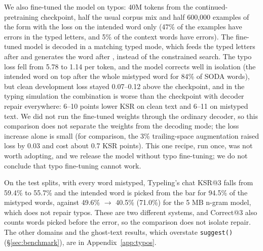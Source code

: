\documentclass[11pt]{article}
\newcommand{\tok}[1]{\texttt{\detokenize{#1}}}
\begin{document}
We also fine-tuned the model on typos: 40M tokens from the continued-pretraining checkpoint, half the usual corpus
mix and half 600,000 examples of the form \tok{context <|typed|> letters <|word|> word </s>} with the loss on the
intended word only (47\% of the examples have errors in the typed letters, and 5\% of the context words have errors).
The fine-tuned model is decoded in a matching typed mode, which feeds the typed letters after \tok{<|typed|>} and
generates the word after \tok{<|word|>}, instead of the constrained search. The typo loss fell from 5.78 to 1.14 per
token, and the model corrects well in isolation (the intended word on top after the whole mistyped word for 84\% of
SODA words), but clean development loss stayed 0.07--0.12 above the checkpoint, and in the typing simulation the
combination is worse than the checkpoint with decoder repair everywhere: 6--10 points lower KSR on clean text and
6--11 on mistyped text. We did not run the fine-tuned weights through the ordinary decoder, so this comparison does
not separate the weights from the decoding mode; the loss increase alone is small (for comparison, the 3\%
trailing-space augmentation raised loss by 0.03 and cost about 0.7 KSR points). This one recipe, run once, was not
worth adopting, and we release the model without typo fine-tuning; we do not conclude that typo fine-tuning cannot
work.

On the test splits, with every word mistyped, Typeling's chat KSR@3 falls from 59.4\% to 55.7\% and the intended
word is picked from the bar for 94.5\% of the mistyped words, against 49.6\% $\to$ 40.5\% (71.0\%) for the 5 MB
n-gram model, which does not repair typos. These are two different systems, and Correct@3 also counts words picked
before the error, so the comparison does not isolate repair. The other domains and the ghost-text results, which
overstate \texttt{suggest()} (\S\ref{sec:benchmark}), are in Appendix~\ref{app:typos}.
\end{document}
